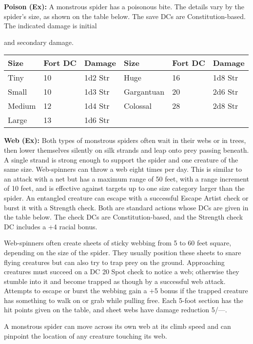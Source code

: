 \documentclass{article}
\begin{document}
\textbf{Poison (Ex):} A monstrous spider has a poisonous bite. The details vary 
by the spider's size, as shown on the table below. The save DCs are Constitution-based. 
The indicated damage is initial

and secondary damage.

\begin{tabular}{|>{\raggedright}p{32pt}|>{\raggedright}p{34pt}|>{\raggedright}p{33pt}|>{\raggedright}p{45pt}|>{\raggedright}p{34pt}|>{\raggedright}p{33pt}|}
\hline
S\textbf{ize} & F\textbf{ort DC} & D\textbf{amage} & S\textbf{ize} & F\textbf{ort 
DC} & D\textbf{amage}\tabularnewline
\hline
Tiny & 10 & 1d2 Str & Huge & 16 & 1d8 Str\tabularnewline
\hline
Small & 10 & 1d3 Str & Gargantuan & 20 & 2d6 Str\tabularnewline
\hline
Medium & 12 & 1d4 Str & Colossal & 28 & 2d8 Str\tabularnewline
\hline
Large & 13 & 1d6 Str &  &  & \tabularnewline
\hline
\end{tabular}

\textbf{Web (Ex): }Both types of monstrous spiders often wait in their webs or 
in trees, then lower themselves silently on silk strands and leap onto prey passing 
beneath. A single strand is strong enough to support the spider and one creature 
of the same size. Web-spinners can throw a web eight times per day. This is similar 
to an attack with a net but has a maximum range of 50 feet, with a range increment 
of 10 feet, and is effective against targets up to one size category larger than 
the spider. An entangled creature can escape with a successful Escape Artist check 
or burst it with a Strength check. Both are standard actions whose DCs are given 
in the table below. The check DCs are Constitution-based, and the Strength check 
DC includes a +4 racial bonus. 

Web-spinners often create sheets of sticky webbing from 5 to 60 feet square, depending 
on the size of the spider. They usually position these sheets to snare flying creatures 
but can also try to trap prey on the ground. Approaching creatures must succeed 
on a DC 20 Spot check to notice a web; otherwise they stumble into it and become 
trapped as though by a successful web attack. Attempts to escape or burst the webbing 
gain a +5 bonus if the trapped creature has something to walk on or grab while 
pulling free. Each 5-foot section has the hit points given on the table, and sheet 
webs have damage reduction 5/---.

A monstrous spider can move across its own web at its climb speed and can pinpoint 
the location of any creature touching its web.
\end{document}
